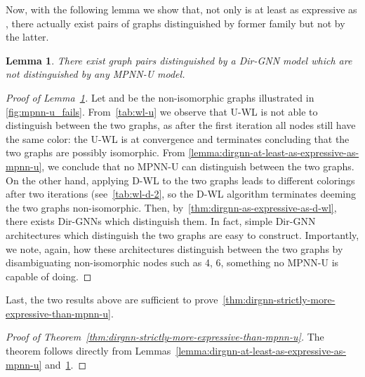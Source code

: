 \documentclass{article}
\newcommand\oursacro{Dir-GNN}
\theoremstyle{plain}
\newtheorem{lemma}[theorem]{Lemma}
\theoremstyle{definition}
\theoremstyle{remark}
\begin{document}
Now, with the following lemma we show that, not only  is at least as expressive as , there actually exist pairs of graphs distinguished by former family but not by the latter.

\begin{lemma}\label{lemma:exists-graphs-distinguished-by-dirgnn-but-not-by-mpnn-u}
    There exist graph pairs distinguished by a \oursacro{} model which are not distinguished by any MPNN-U model.
\end{lemma}
\begin{proof}[Proof of Lemma~\ref{lemma:exists-graphs-distinguished-by-dirgnn-but-not-by-mpnn-u}]
    Let  and  be the non-isomorphic graphs illustrated in \cref{fig:mpnn-u_fails}. From~\cref{tab:wl-u} we observe that U-WL is not able to distinguish between the two graphs, as after the first iteration all nodes still have the same color: the U-WL is at convergence and terminates concluding that the two graphs are possibly isomorphic. From \cref{lemma:dirgnn-at-least-as-expressive-as-mpnn-u}, we conclude that no MPNN-U can distinguish between the two graphs. On the other hand, applying D-WL to the two graphs leads to different colorings after two iterations (see~\cref{tab:wl-d-2}, so the D-WL algorithm terminates deeming the two graphs non-isomorphic. Then, by~\cref{thm:dirgnn-as-expressive-as-d-wl}, there exists \oursacro{}s which distinguish them. In fact, simple \oursacro{} architectures which distinguish the two graphs are easy to construct. Importantly, we note, again, how these architectures distinguish between the two graphs by disambiguating non-isomorphic nodes such as 4, 6, something no MPNN-U is capable of doing.
\end{proof}

Last, the two results above are sufficient to prove~\cref{thm:dirgnn-strictly-more-expressive-than-mpnn-u}.

\begin{proof}[Proof of Theorem~\ref{thm:dirgnn-strictly-more-expressive-than-mpnn-u}]
    The theorem follows directly from Lemmas~\ref{lemma:dirgnn-at-least-as-expressive-as-mpnn-u} and~\ref{lemma:exists-graphs-distinguished-by-dirgnn-but-not-by-mpnn-u}.
\end{proof}
\end{document}

